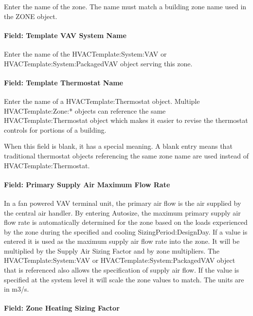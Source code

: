 Enter the name of the zone. The name must match a building zone name used in the ZONE object.

\paragraph{Field: Template VAV System Name}\label{field-template-vav-system-name-1}

Enter the name of the HVACTemplate:System:VAV or HVACTemplate:System:PackagedVAV object serving this zone.

\paragraph{Field: Template Thermostat Name}\label{field-template-thermostat-name-9}

Enter the name of a HVACTemplate:Thermostat object. Multiple HVACTemplate:Zone:* objects can reference the same HVACTemplate:Thermostat object which makes it easier to revise the thermostat controls for portions of a building.

When this field is blank, it has a special meaning. A blank entry means that traditional thermostat objects referencing the same zone name are used instead of HVACTemplate:Thermostat.

\paragraph{Field: Primary Supply Air Maximum Flow Rate}\label{field-primary-supply-air-maximum-flow-rate}

In a fan powered VAV terminal unit, the primary air flow is the air supplied by the central air handler. By entering Autosize, the maximum primary supply air flow rate is automatically determined for the zone based on the loads experienced by the zone during the specified and cooling SizingPeriod:DesignDay. If a value is entered it is used as the maximum supply air flow rate into the zone. It will be multiplied by the Supply Air Sizing Factor and by zone multipliers. The HVACTemplate:System:VAV or HVACTemplate:System:PackagedVAV object that is referenced also allows the specification of supply air flow. If the value is specified at the system level it will scale the zone values to match. The units are in m3/s.

\paragraph{Field: Zone Heating Sizing Factor}\label{field-zone-heating-sizing-factor-8}


